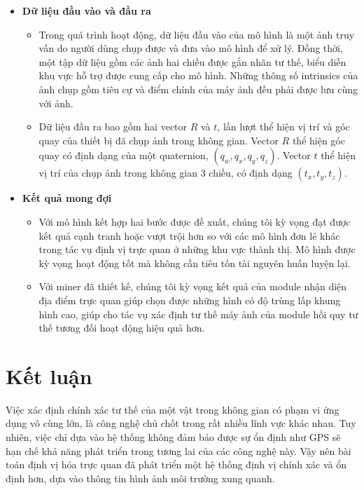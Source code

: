\begin{itemize}
  \item \textbf{Dữ liệu đầu vào và đầu ra}
        \begin{itemize}
          \item Trong quá trình hoạt động, dữ liệu đầu vào của mô hình là một ảnh truy vấn do người dùng chụp được và đưa vào mô hình để xử lý. Đồng thời, một tập dữ liệu gồm các ảnh hai chiều được gắn nhãn tư thế, biểu diễn khu vực hỗ trợ được cung cấp cho mô hình. Những thông số intrinsics của ảnh chụp gồm tiêu cự và điểm chính của máy ảnh đều phải được lưu cùng với ảnh.
          \item Dữ liệu đầu ra bao gồm hai vector $R$ và $t$, lần lượt thể hiện vị trí và góc quay của thiết bị đã chụp ảnh trong không gian. Vector $R$ thể hiện góc quay có định dạng của một quaternion, $(q_w,q_x,q_y,q_z)$. Vector $t$ thể hiện vị trí của chụp ảnh trong không gian 3 chiều, có định dạng $(t_x,t_y,t_z)$.
        \end{itemize}
  \item \textbf{Kết quả mong đợi}
        \begin{itemize}
          \item Với mô hình kết hợp hai bước được đề xuất, chúng tôi kỳ vọng đạt được kết quả cạnh tranh hoặc vượt trội hơn so với các mô hình đơn lẻ khác trong tác vụ định vị trực quan ở những khu vực thành thị. Mô hình được kỳ vọng hoạt động tốt mà không cần tiêu tốn tài nguyên huấn luyện lại.
          \item Với miner đã thiết kế, chúng tôi kỳ vọng kết quả của module nhận diện địa điểm trực quan giúp chọn được những hình có độ trùng lấp khung hình cao, giúp cho tác vụ xác định tư thế máy ảnh của module hồi quy tư thế tương đối hoạt động hiệu quả hơn.
        \end{itemize}
\end{itemize}

\section{Kết luận}
Việc xác định chính xác tư thế của một vật trong không gian có phạm vi ứng dụng vô cùng lớn, là công nghệ chủ chốt trong rất nhiều lĩnh vực khác nhau. Tuy nhiên, việc chỉ dựa vào hệ thống không đảm bảo được sự ổn định như GPS sẽ hạn chế khả năng phát triển trong tương lai của các công nghệ này. Vậy nên bài toán định vị hóa trực quan đã phát triển một hệ thống định vị chính xác và ổn định hơn, dựa vào thông tin hình ảnh môi trường xung quanh.

